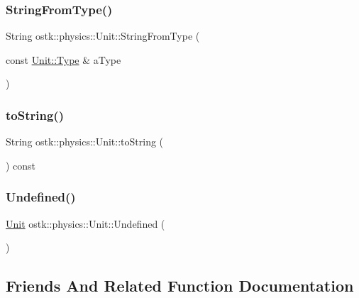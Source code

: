 \subsubsection{\texorpdfstring{String\+From\+Type()}{StringFromType()}}
{\footnotesize\ttfamily String ostk\+::physics\+::\+Unit\+::\+String\+From\+Type (\begin{DoxyParamCaption}\item[{const \hyperlink{classostk_1_1physics_1_1_unit_a1c07d36cd02be8541eb972367e2b628f}{Unit\+::\+Type} \&}]{a\+Type }\end{DoxyParamCaption})\hspace{0.3cm}{\ttfamily [static]}}

\mbox{\label{classostk_1_1physics_1_1_unit_a496115fe0905a2a26b6f742382f3b7f0}} 
\subsubsection{\texorpdfstring{to\+String()}{toString()}}
{\footnotesize\ttfamily String ostk\+::physics\+::\+Unit\+::to\+String (\begin{DoxyParamCaption}{ }\end{DoxyParamCaption}) const}

\mbox{\label{classostk_1_1physics_1_1_unit_a61c8e231a744ece53683ae79deee0850}} 
\subsubsection{\texorpdfstring{Undefined()}{Undefined()}}
{\footnotesize\ttfamily \hyperlink{classostk_1_1physics_1_1_unit}{Unit} ostk\+::physics\+::\+Unit\+::\+Undefined (\begin{DoxyParamCaption}{ }\end{DoxyParamCaption})\hspace{0.3cm}{\ttfamily [static]}}



\subsection{Friends And Related Function Documentation}
\mbox{\label{classostk_1_1physics_1_1_unit_a70630a82d569152709a999efabdb3e4f}} 
